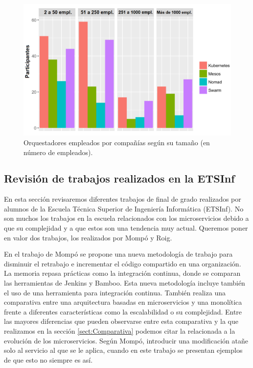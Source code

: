 \documentclass[11pt,spanish,listoffigures]{tfgetsinf}
\begin{document}
\begin{figure}[h]
\centering
\includegraphics[scale=0.6]{Comparativa_Orquestadores_ES} 
\caption{Orquestadores empleados por compañías según su tamaño (en número de empleados).}
\label{fig:Comparativa_Orquestadores_ES}
\end{figure}

\subsection{Revisión de trabajos realizados en la ETSInf}

En esta sección revisaremos diferentes trabajos de final de grado realizados por alumnos de la Escuela Técnica Superior de Ingeniería Informática (ETSInf). No son muchos los trabajos en la escuela relacionados con los microservicios debido a que su complejidad y a que estos son una tendencia muy actual. Queremos poner en valor dos trabajos, los realizados por Mompó \cite{Mompo2017} y Roig\cite{Roig2017}.

En el trabajo de Mompó se propone una nueva metodología de trabajo para disminuir el retrabajo e incrementar el código compartido en una organización. La memoria repasa prácticas como la integración continua, donde se comparan las herramientas de Jenkins y Bamboo. Esta nueva metodología incluye también el uso de una herramienta para integración continua. También realiza una comparativa entre una arquitectura basadas en microservicios y una monolítica frente a diferentes características como la escalabilidad o su complejidad. Entre las mayores diferencias que pueden observarse entre esta comparativa y la que realizamos en la sección \ref{sect:Comparativa}  podemos citar la relacionada a la evolución de los microservicios. Según Mompó, introducir una modificación atañe solo al servicio al que se le aplica, cuando en este trabajo se presentan ejemplos de que esto no siempre es así.
\end{document}
